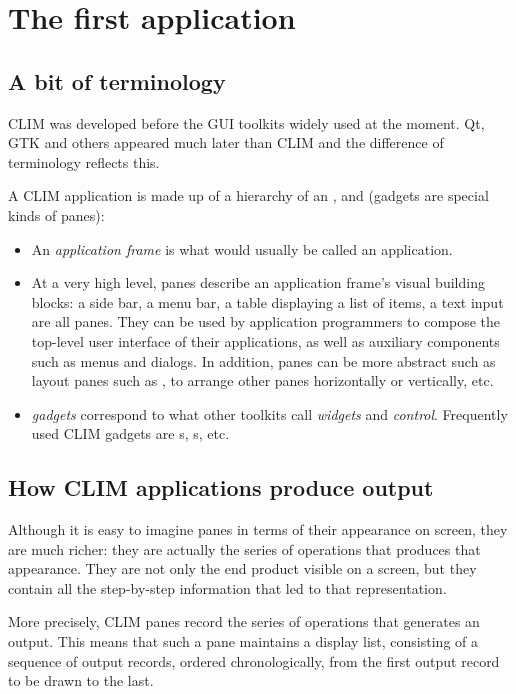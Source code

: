 \chapter{The first application}


\section{A bit of terminology}

CLIM was developed before the GUI toolkits widely used at the moment.
Qt, GTK and others appeared much later than CLIM and the difference of
terminology reflects this.

A CLIM application is made up of a hierarchy of an ,  and  (gadgets are special kinds
of panes):

\begin{itemize}
\item
  An \emph{application frame} is what would usually be called an
  application.

\item
  At a very high level, panes describe an application frame's visual
  building blocks: a side bar, a menu bar, a table displaying a list
  of items, a text input are all panes. They can be used by
  application programmers to compose the top-level user interface of
  their applications, as well as auxiliary components such as menus
  and dialogs. In addition, panes can be more abstract such as layout
  panes such as ,  to arrange other panes
  horizontally or vertically, etc.

\item
  \emph{gadgets} correspond to what other toolkits call \emph{widgets}
  and \emph{control}.  Frequently used CLIM gadgets are
  s, s, etc.
\end{itemize}


\section{How CLIM applications produce output}

Although it is easy to imagine panes in terms of their appearance on
screen, they are much richer: they are actually the series of
operations that produces that appearance. They are not only the end
product visible on a screen, but they contain all the step-by-step
information that led to that representation.

More precisely, CLIM panes record the series of operations that
generates an output.  This means that such a pane maintains a display
list, consisting of a sequence of output records, ordered
chronologically, from the first output record to be drawn to the last.

